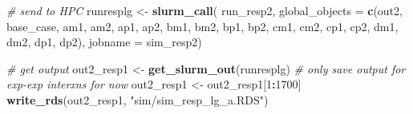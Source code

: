 \documentclass[12pt, twoside]{amherstthesis}
\newenvironment{Shaded}{\begin{snugshade}}{\end{snugshade}}
\newcommand{\AttributeTok}[1]{\textcolor[rgb]{0.13,0.29,0.53}{#1}}
\newcommand{\CommentTok}[1]{\textcolor[rgb]{0.56,0.35,0.01}{\textit{#1}}}
\newcommand{\DecValTok}[1]{\textcolor[rgb]{0.00,0.00,0.81}{#1}}
\newcommand{\FunctionTok}[1]{\textcolor[rgb]{0.13,0.29,0.53}{\textbf{#1}}}
\newcommand{\NormalTok}[1]{#1}
\newcommand{\OtherTok}[1]{\textcolor[rgb]{0.56,0.35,0.01}{#1}}
\newcommand{\SpecialCharTok}[1]{\textcolor[rgb]{0.81,0.36,0.00}{\textbf{#1}}}
\newcommand{\StringTok}[1]{\textcolor[rgb]{0.31,0.60,0.02}{#1}}
\begin{document}
\begin{Shaded}
\begin{Highlighting}[]
\CommentTok{\# send to HPC}
\NormalTok{runresplg }\OtherTok{\textless{}{-}} \FunctionTok{slurm\_call}\NormalTok{(}
\NormalTok{  run\_resp2, }
  \AttributeTok{global\_objects =} \FunctionTok{c}\NormalTok{(}\StringTok{\textquotesingle{}out2\textquotesingle{}}\NormalTok{, }\StringTok{\textquotesingle{}base\_case\textquotesingle{}}\NormalTok{, }
                     \StringTok{\textquotesingle{}am1\textquotesingle{}}\NormalTok{, }\StringTok{\textquotesingle{}am2\textquotesingle{}}\NormalTok{, }\StringTok{\textquotesingle{}ap1\textquotesingle{}}\NormalTok{, }\StringTok{\textquotesingle{}ap2\textquotesingle{}}\NormalTok{, }
                     \StringTok{\textquotesingle{}bm1\textquotesingle{}}\NormalTok{, }\StringTok{\textquotesingle{}bm2\textquotesingle{}}\NormalTok{, }\StringTok{\textquotesingle{}bp1\textquotesingle{}}\NormalTok{, }\StringTok{\textquotesingle{}bp2\textquotesingle{}}\NormalTok{, }
                     \StringTok{\textquotesingle{}cm1\textquotesingle{}}\NormalTok{, }\StringTok{\textquotesingle{}cm2\textquotesingle{}}\NormalTok{, }\StringTok{\textquotesingle{}cp1\textquotesingle{}}\NormalTok{, }\StringTok{\textquotesingle{}cp2\textquotesingle{}}\NormalTok{, }
                     \StringTok{\textquotesingle{}dm1\textquotesingle{}}\NormalTok{, }\StringTok{\textquotesingle{}dm2\textquotesingle{}}\NormalTok{, }\StringTok{\textquotesingle{}dp1\textquotesingle{}}\NormalTok{, }\StringTok{\textquotesingle{}dp2\textquotesingle{}}\NormalTok{),}
  \AttributeTok{jobname =} \StringTok{\textquotesingle{}sim\_resp2\textquotesingle{}}\NormalTok{)}

\CommentTok{\# get output}
\NormalTok{out2\_resp1 }\OtherTok{\textless{}{-}} \FunctionTok{get\_slurm\_out}\NormalTok{(runresplg)}
\CommentTok{\# only save output for exp{-}exp interxns for now}
\NormalTok{out2\_resp1 }\OtherTok{\textless{}{-}}\NormalTok{ out2\_resp1[}\DecValTok{1}\SpecialCharTok{:}\DecValTok{1700}\NormalTok{]}
\FunctionTok{write\_rds}\NormalTok{(out2\_resp1, }\StringTok{"sim/sim\_resp\_lg\_a.RDS"}\NormalTok{)}
\end{Highlighting}
\end{Shaded}
\normalsize
\end{document}
